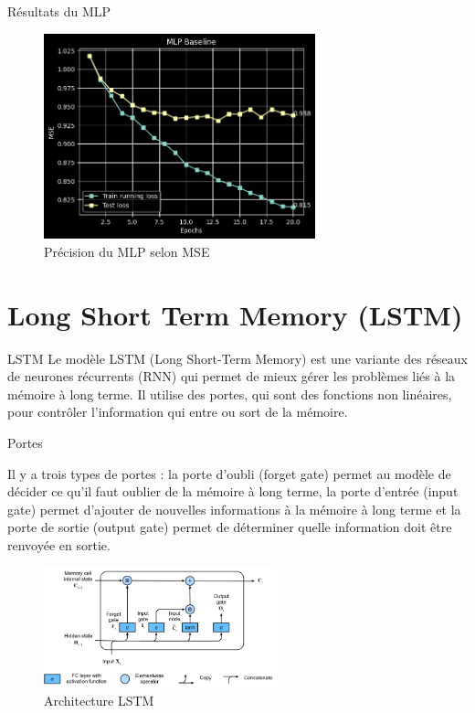\documentclass{beamer}
\begin{document}
\begin{frame}{Résultats du MLP}
\begin{figure} \label{fig:mlp}
    \caption{Précision du MLP selon MSE} \center
    \includegraphics[width=0.7\textwidth]{images/mlp.png}
\end{figure}
\end{frame}


\section{Long Short Term Memory (LSTM)}

\begin{frame}{LSTM}
Le modèle LSTM (Long Short-Term Memory) est une variante des réseaux de neurones récurrents (RNN) qui permet de mieux gérer les problèmes liés à la mémoire à long terme. Il utilise des portes, qui sont des fonctions non linéaires, pour contrôler l'information qui entre ou sort de la mémoire.
\end{frame}


\begin{frame}{Portes}

Il y a trois types de portes : la porte d'oubli (forget gate) permet au modèle de décider ce qu'il faut oublier de la mémoire à long terme, la porte d'entrée (input gate) permet d'ajouter de nouvelles informations à la mémoire à long terme et la porte de sortie (output gate) permet de déterminer quelle information doit être renvoyée en sortie.
\begin{figure} \label{fig:architecture_lstm}
    \caption{Architecture LSTM} \center
    \includegraphics[width=0.6\textwidth]{images/lstm-schema.png}
\end{figure}

\end{frame}
\end{document}
